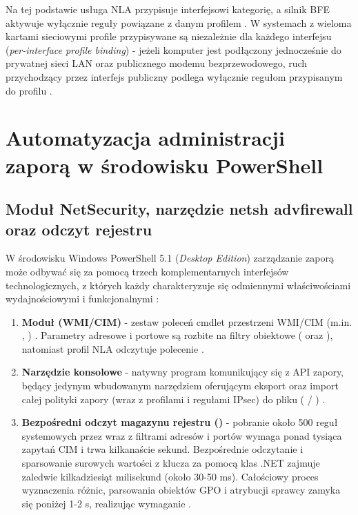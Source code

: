 Na tej podstawie usługa NLA przypisuje interfejsowi kategorię, a silnik BFE aktywuje wyłącznie reguły powiązane z danym profilem \cite{ms-wfp}. W systemach z wieloma kartami sieciowymi profile przypisywane są niezależnie dla każdego interfejsu (\textit{per-interface profile binding}) - jeżeli komputer jest podłączony jednocześnie do prywatnej sieci LAN oraz publicznego modemu bezprzewodowego, ruch przychodzący przez interfejs publiczny podlega wyłącznie regułom przypisanym do profilu .

\section{Automatyzacja administracji zaporą w środowisku PowerShell}\label{sec:automatyzacja-powershell}

\subsection{Moduł NetSecurity, narzędzie netsh advfirewall oraz odczyt rejestru}\label{subsec:modul-netsecurity}

W środowisku Windows PowerShell 5.1 (\textit{Desktop Edition}) zarządzanie zaporą może odbywać się za pomocą trzech komplementarnych interfejsów technologicznych, z których każdy charakteryzuje się odmiennymi właściwościami wydajnościowymi i funkcjonalnymi \cite{ms-netsecurity-module, ms-netsh-advfirewall}:

\begin{enumerate}
    \item \textbf{Moduł  (WMI/CIM)} - zestaw poleceń cmdlet przestrzeni WMI/CIM (m.in. , ) \cite{ms-new-netfirewallrule}. Parametry adresowe i portowe są rozbite na filtry obiektowe ( oraz ), natomiast profil NLA odczytuje polecenie .
    \item \textbf{Narzędzie konsolowe } - natywny program komunikujący się z API zapory, będący jedynym wbudowanym narzędziem oferującym eksport oraz import całej polityki zapory (wraz z profilami i regułami IPsec) do pliku  ( / ) \cite{ms-netsh-advfirewall}.
    \item \textbf{Bezpośredni odczyt magazynu rejestru ()} - pobranie około 500 reguł systemowych przez  wraz z filtrami adresów i portów wymaga ponad tysiąca zapytań CIM i trwa kilkanaście sekund. Bezpośrednie odczytanie i sparsowanie surowych wartości z klucza  za pomocą klas .NET zajmuje zaledwie kilkadziesiąt milisekund (około 30-50 ms). Całościowy proces wyznaczenia różnic, parsowania obiektów GPO i atrybucji sprawcy zamyka się poniżej 1-2 s, realizując wymaganie .
\end{enumerate}

